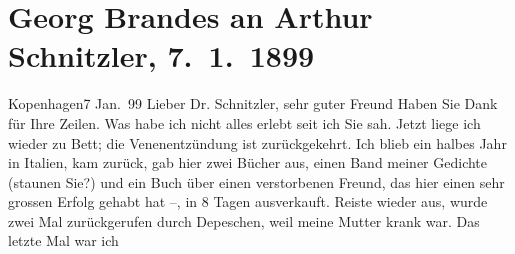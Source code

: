 

         
         \newcommand{\erwaehntePersonen}{Personen: Richard Beer-Hofmann, Emilie Brandes, Joris-Karl Huysmans}
         \newcommand{\erwaehnteInstitutionen}{}
         \newcommand{\erwaehnteOrte}{Orte: Deutschland, Dänemark, Frankreich, Italien, Kopenhagen, Lviv, Polen, Preußen, Südschleswig, Wien}
         \newcommand{\erwaehnteWerke}{Werke: Das Vermächtnis. Schauspiel in drei Akten, Ein Dilemma, Julius Lange, Polen, Ungdomsvers [Jugendgedichte]}
               \section[Georg Brandes an Arthur Schnitzler, 7. 1. 1899]{ Georg Brandes an Arthur Schnitzler, 7. 1. 1899}\nopagebreak{}\rehead{ }\begin{ledgroupsized}[t]{13cm}\normalsize\beginnumbering \toendnotes[C]{\smallbreak\pagebreak[2]} 
\toendnotes[C]{\smallbreak}\pstart
           \raggedleft{}{\pb}Kopenhagen7 Jan. 99\pend
           \pstart{}Lieber Dr. Schnitzler, sehr guter Freund\pend\pstart
           Haben Sie Dank für Ihre Zeilen. Was habe ich nicht alles erlebt seit ich Sie sah.
                    Jetzt liege ich wieder zu Bett; die Venenentzündung ist zurückgekehrt.\pend
           \pstart
           Ich blieb ein halbes Jahr in Italien, kam
                    zurück, gab hier zwei Bücher aus, einen Band meiner Gedichte (staunen Sie?) und ein Buch über einen verstorbenen Freund, das
                    hier einen sehr grossen Erfolg gehabt hat –, in 8 Tagen ausverkauft. Reiste
                    wieder aus, wurde zwei Mal zurückgerufen durch Depeschen, {\pb}weil meine Mutter krank war. Das letzte Mal war ich

\end{ledgroupsized}
